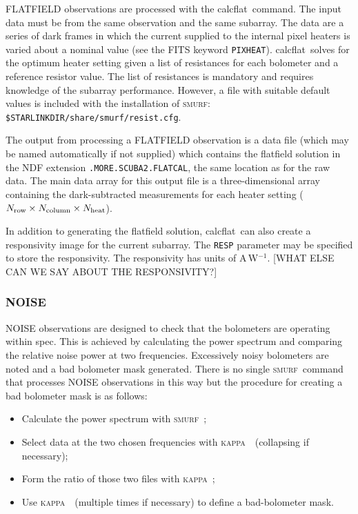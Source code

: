 \documentclass[twoside,11pt]{article}
\newcommand{\xref}[3]{#1}
\renewcommand{\_}{\texttt{\symbol{95}}}
\newcommand{\KAPPA}{\textsc{kappa}}
\newcommand{\SMURF}{\textsc{smurf}}
\newcommand{\task}[1]{\textsf{#1}}
\newcommand{\calcflat}{\xref{\task{calcflat}}{sun258}{CALCFLAT}}
\begin{document}
FLATFIELD observations are processed with the \calcflat\ command. The
input data must be from the same observation and the same
subarray. The data are a series of dark frames in which the current
supplied to the internal pixel heaters is varied about a nominal value
(see the FITS keyword \texttt{PIXHEAT}). \calcflat\ solves for the
optimum heater setting given a list of resistances for each bolometer
and a reference resistor value. The list of resistances is mandatory
and requires knowledge of the subarray performance. However, a file
with suitable default values is included with the installation of
\SMURF: \texttt{\$STARLINK\_DIR/share/smurf/resist.cfg}.

The output from processing a FLATFIELD observation is a data file
(which may be named automatically if not supplied) which contains the
flatfield solution in the NDF extension \texttt{.MORE.SCUBA2.FLATCAL},
the same location as for the raw data. The main data array for this
output file is a three-dimensional array containing the
dark-subtracted measurements for each heater setting ($N_{\rm
  row}\times N_{\rm column} \times N_{\rm heat}$).

In addition to generating the flatfield solution, \calcflat\ can also
create a responsivity image for the current subarray. The
\texttt{RESP} parameter may be specified to store the
responsivity. The responsivity has units of A\,W$^{-1}$. [WHAT ELSE
CAN WE SAY ABOUT THE RESPONSIVITY?]

\subsubsection{NOISE}

NOISE observations are designed to check that the bolometers are
operating within spec. This is achieved by calculating the power
spectrum and comparing the relative noise power at two frequencies.
Excessively noisy bolometers are noted and a bad bolometer mask
generated. There is no single \SMURF\ command that processes NOISE
observations in this way but the procedure for creating a bad
bolometer mask is as follows:
\begin{itemize}
\item Calculate the power spectrum with \SMURF\ \sctwofft;
\item Select data at the two chosen frequencies with \KAPPA\ \ndfcopy\
  (collapsing if necessary);
\item Form the ratio of those two files with \KAPPA\ \kapdiv;
\item Use \KAPPA\ \thresh\ (multiple times if necessary) to define a
  bad-bolometer mask.
\end{itemize}
\end{document}
